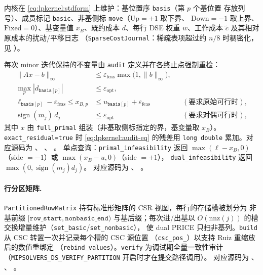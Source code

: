 内核在 \eqref{eq:lpkernel:stdform} 上维护：基位置序 \texttt{basis}（第 $p$ 个基位置
存放列号）、成员标记 \texttt{basic}、非基侧标 \texttt{move}（$\mathrm{Up}=+1$ 取下界、
$\mathrm{Down}=-1$ 取上界、$\mathrm{Fixed}=0$）、基变量值 $x_B$、既约成本
$d$、每行 DSE 权重 $w$、工作成本 $\tilde c$ 及其相对原成本的扰动/平移日志
（\texttt{SparseCostJournal}：稀疏表项超过约 $n/8$ 时稠密化，
见 ）。

每次 minor 迭代保持的不变量由 \texttt{audit} 定义并在各终止点强制重检：
\begin{align}
  \|A x - b\|_{\infty} &\le \varepsilon_{\text{feas}}
      \max\bigl(1, \|b\|_{\infty}\bigr),
  \label{eq:lpkernel:audit-eq}\\
  \max_{p} |d_{\texttt{basis}[p]}| &\le \varepsilon_{\text{opt}},\\
  \ell_{\texttt{basis}[p]} - \varepsilon_{\text{feas}} \le x_{B,p}
      &\le u_{\texttt{basis}[p]} + \varepsilon_{\text{feas}}
      &&(\text{要求原始可行时}),\\
  \operatorname{sign}(m_j)\, d_j &\le \varepsilon_{\text{opt}}
      &&(\text{要求对偶可行时}),
\end{align}
其中 $x$ 由 \texttt{full\_primal} 组装（非基取侧标指定的界，基变量取 $x_B$）。
\texttt{exact\_residual=true} 时 \eqref{eq:lpkernel:audit-eq} 的残差用
\texttt{long double} 累加。对应源码为
、
、
。
单点查询：\texttt{primal\_infeasibility} 返回
$\max(\ell - x_B, 0)$（side $=-1$）或 $\max(x_B - u, 0)$（side $=+1$），
\texttt{dual\_infeasibility} 返回 $\max(0, \operatorname{sign}(m_j) d_j)$。
对应源码为 、
。

\paragraph{行分区矩阵.}
\texttt{PartitionedRowMatrix} 持有标准形矩阵的 CSR 视图，每行的存储槽被划分为
非基前缀 $[\texttt{row\_start}, \texttt{nonbasic\_end})$ 与基后缀；每次进/出基以
$O(\mathrm{nnz}(j))$ 的槽交换增量维护（\texttt{set\_basic}/\texttt{set\_nonbasic}），
使 dual PRICE 只扫非基列。\texttt{build} 从 CSC 转置一次并记录每个槽的 CSC 源位置
（\texttt{csc\_pos\_}）以支持 Ruiz 重缩放后的数值重绑定
（\texttt{rebind\_values}）。\texttt{verify} 为调试期全量一致性审计
（\texttt{MIPSOLVERS\_DS\_VERIFY\_PARTITION} 开启时才在提交路径调用）。
对应源码为 、
、
。

